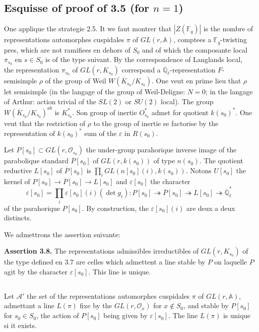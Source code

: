 \documentclass[11pt,a4paper]{article}
\theoremstyle{plain}
\theoremstyle{definition}
\newcommand{\F}{\mathbb{F}}
\newcommand{\Ql}{\overline{\mathbb{Q}}_\ell}
\begin{document}
\subsection{Esquisse of proof of 3.5 (for $n = 1$)}
One applique the strategie 2.5. It we faut montrer that $|Z(\F_q)|$ is the nombre of representations automorphes cuspidales $\pi$ of $GL(r, \mathbb{A})$, comptees a $\F_q$-twisting pres, which are not ramifiees en dehors of $S_0$ and of which the composante local $\pi_{s_0}$ en $s \in S_0$ is of the type suivant. By the correspondence of Langlands local, the representation $\pi_{s_0}$ of $GL(r, K_{s_0})$ correspond a $\Ql$-representation $F$-semisimple $\rho$ of the group of Weil $W(\overline{K}_{s_0}/K_{s_0})$. One veut en prime lieu that $\rho$ let semisimple (in the langage of the group of Weil-Deligne: $N = 0$; in the langage of Arthur: action trivial of the $SL(2)$ or $SU(2)$ local). The group $W(\overline{K}_{s_0}/K_{s_0})^{ab}$ is $K_{s_0}^*$. Son group of inertie $O_{s_0}^*$ admet for quotient $k(s_0)^*$. One veut that the restriction of $\rho$ to the group of inertie se factorise by the representation of $k(s_0)^*$ sum of the $\varepsilon$ in $R(s_0)$.

Let $P[s_0] \subset GL(r, \mathcal{O}_{s_0})$ the under-group parahorique inverse image of the parabolique standard $\overline{P}[s_0]$ of $GL(r, k(s_0))$ of type $n(s_0)$. The quotient reductive $L[s_0]$ of $\overline{P}[s_0]$ is $\prod_i GL(n[s_0](i), k(s_0))$. Notons $U[s_0]$ the kernel of $P[s_0] \to \overline{P}[s_0] \to L[s_0]$ and $\varepsilon[s_0]$ the character
\[
\varepsilon[s_0] = \prod_i \varepsilon[s_0](i)(\det g_i): P[s_0] \twoheadrightarrow \overline{P}[s_0] \twoheadrightarrow L[s_0] \twoheadrightarrow \Ql^*
\]
of the parahorique $P[s_0]$. By construction, the $\varepsilon[s_0](i)$ are deux a deux distincts.

We admettrons the assertion suivante:

\textbf{Assertion 3.8.} The representations admissibles irreductibles of $GL(r, K_{s_0})$ of the type defined en 3.7 are celles which admettent a line stable by $P$ on laquelle $P$ agit by the character $\varepsilon[s_0]$. This line is unique.

\subsection{}
Let $\mathcal{A}'$ the set of the representations automorphes cuspidales $\pi$ of $GL(r, \mathbb{A})$, admettant a line $L(\pi)$ fixe by the $GL(r, \mathcal{O}_x)$ for $x \notin S_0$, and stable by $P[s_0]$ for $s_0 \in S_0$, the action of $P[s_0]$ being given by $\varepsilon[s_0]$. The line $L(\pi)$ is unique si it exists.
\end{document}

